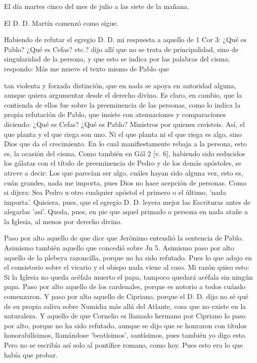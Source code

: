 El día martes cinco del mes de julio a las siete de la mañana.

El D. D. Martín comenzó como sigue.

Habiendo de refutar el egregio D. D. mi respuesta a aquello de 1 Cor 3: ¿Qué es Pablo? ¿Qué es Cefas? etc.? dijo allí que no se trata de principalidad, sino de singularidad de la persona, y que esto se indica por las palabras del cisma; respondo: Más me mueve el texto mismo de Pablo que

tan violenta y forzada distinción, que en nada se apoya en autoridad alguna, aunque quiera argumentar desde el derecho divino. Es claro, en cambio, que la contienda de ellos fue sobre la preeminencia de las personas, como lo indica la propia refutación de Pablo, que insiste con atenuaciones y comparaciones diciendo: ¿Qué es Cefas? ¿Qué es Pablo? Ministros por quienes creísteis. Así, el que planta y el que riega son uno. Ni el que planta ni el que riega es algo, sino Dios que da el crecimiento. En lo cual manifiestamente rebaja a la persona, esto es, la ocasión del cisma. Como también en Gál 2 [v. 6], habiendo sido seducidos los gálatas con el título de preeminencia de Pedro y de los demás apóstoles, se atreve a decir: Los que parecían ser algo, cuáles hayan sido alguna vez, esto es, cuán grandes, nada me importa, pues Dios no hace acepción de personas. Como si dijera: Sea Pedro u otro cualquier apóstol el primero o el último, 'nada importa'. Quisiera, pues, que el egregio D. D. leyera mejor las Escrituras antes de alegarlas 'así'. Queda, pues, en pie que aquel primado o persona en nada atañe a la Iglesia, al menos por derecho divino.

Paso por alto aquello de que dice que Jerónimo entendió la sentencia de Pablo. Asimismo también aquello que concedió sobre Jn 5. Asimismo paso por alto aquello de la plebeya razoncilla, porque no ha sido refutado. Pues lo que adujo en el consistorio sobre el vicario y el obispo nada viene al caso. Mi razón quiso esto: Si la Iglesia no queda acéfala muerto el papa, tampoco quedará acéfala sin ningún papa. Paso por alto aquello de los cardenales, porque es notorio a todos cuándo comenzaron. Y paso por alto aquello de Cipriano, porque el D. D. dijo no sé qué de su propia saliva sobre Numidia más allá del Atlante, cosa que no existe en la naturaleza. Y aquello de que Cornelio es llamado hermano por Cipriano lo paso por alto, porque no ha sido refutado, aunque se dijo que se honraron con títulos honorabilísimos, llamándose 'beatísimos', santísimos, pues también yo digo esto. Pero no se escribía así solo al pontífice romano, como hoy. Pues esto era lo que había que probar.

